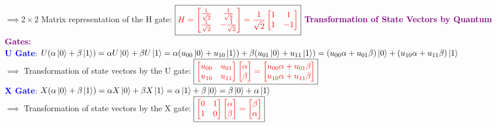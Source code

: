 \documentclass{book}
\begin{document}
\hspace{3cm} $\implies 2\times 2$ Matrix representation of the H gate: $\boxed{\textcolor{red}{H = \begin{bmatrix}
        \frac{1}{\sqrt{2}} & \frac{1}{\sqrt{2}} \\
        \frac{1}{\sqrt{2}} & -\frac{1}{\sqrt{2}}
    \end{bmatrix} = \frac{1}{\sqrt{2}}\begin{bmatrix}
        1 & 1 \\
        1 & -1
    \end{bmatrix}}} $
\newpage
\textcolor{purple}{\textbf{Transformation of State Vectors by Quantum Gates:}}\\
\textcolor{blue}{\textbf{U Gate}}: \( U(\alpha \ket{0} + \beta \ket{1}) = \alpha U\ket{0} + \beta U\ket{1} = \alpha(u_{00}\ket{0} + u_{10}\ket{1}) + \beta(u_{01}\ket{0} + u_{11}\ket{1}) = (u_{00}\alpha + u_{01}\beta)\ket{0} + (u_{10}\alpha + u_{11}\beta)\ket{1} \)\\
\hspace{1.5cm} $\implies$ Transformation of state vectors by the U gate: $\boxed{\textcolor{red}{\begin{bmatrix} u_{00} & u_{01} \\ u_{10} & u_{11} \end{bmatrix} \begin{bmatrix} \alpha \\ \beta \end{bmatrix} = \begin{bmatrix} u_{00}\alpha + u_{01}\beta \\ u_{10}\alpha + u_{11}\beta \end{bmatrix}}}$\\
\vspace{2mm}
\textcolor{blue}{\textbf{X Gate}}: \( X(\alpha \ket{0} + \beta \ket{1}) = \alpha X\ket{0} + \beta X\ket{1} = \alpha\ket{1} + \beta\ket{0} = \beta\ket{0} + \alpha\ket{1} \)\\
\hspace{1.5cm} $\implies$ Transformation of state vectors by the X gate: $\boxed{\textcolor{red}{\begin{bmatrix} 0 & 1 \\ 1 & 0 \end{bmatrix} \begin{bmatrix} \alpha \\ \beta \end{bmatrix} = \begin{bmatrix} \beta \\ \alpha \end{bmatrix}}}$\\
\end{document}
